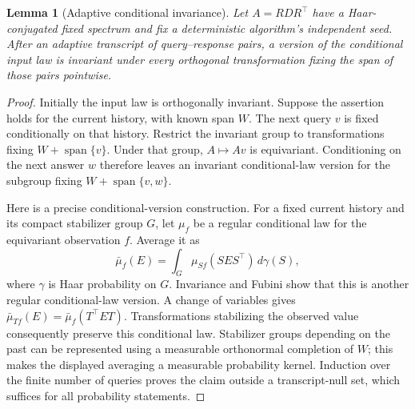 \documentclass[11pt]{article}
\newtheorem{lemma}[theorem]{Lemma}
\theoremstyle{definition}
\newcommand{\spn}{\operatorname{span}}
\begin{document}
\begin{lemma}[Adaptive conditional invariance]\label{lem:invariance}
Let $A=RDR^\top$ have a Haar-conjugated fixed spectrum and fix a deterministic algorithm's independent seed. After an adaptive transcript of query--response pairs, a version of the conditional input law is invariant under every orthogonal transformation fixing the span of those pairs pointwise.
\end{lemma}
\begin{proof}
Initially the input law is orthogonally invariant. Suppose the assertion holds for the current history, with known span $W$. The next query $v$ is fixed conditionally on that history. Restrict the invariant group to transformations fixing $W+\spn\{v\}$. Under that group, $A\mapsto Av$ is equivariant. Conditioning on the next answer $w$ therefore leaves an invariant conditional-law version for the subgroup fixing $W+\spn\{v,w\}$.

Here is a precise conditional-version construction. For a fixed current history and its compact stabilizer group $G$, let $\mu_f$ be a regular conditional law for the equivariant observation $f$. Average it as
\[
 \bar\mu_f(E)=\int_G\mu_{Sf}(SES^\top)\,d\gamma(S),
\]
where $\gamma$ is Haar probability on $G$. Invariance and Fubini show that this is another regular conditional-law version. A change of variables gives $\bar\mu_{Tf}(E)=\bar\mu_f(T^\top ET)$. Transformations stabilizing the observed value consequently preserve this conditional law. Stabilizer groups depending on the past can be represented using a measurable orthonormal completion of $W$; this makes the displayed averaging a measurable probability kernel. Induction over the finite number of queries proves the claim outside a transcript-null set, which suffices for all probability statements.
\end{proof}
\end{document}
